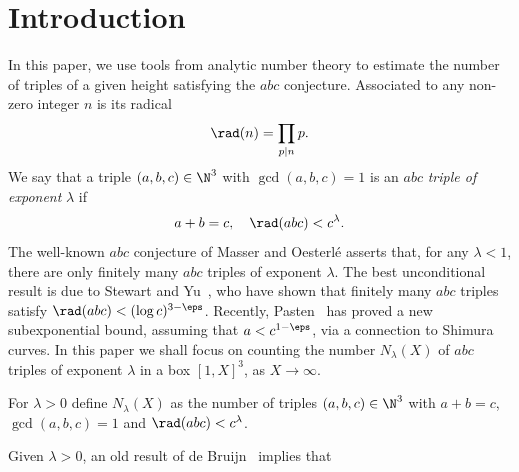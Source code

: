 
%

\chapter{Introduction}

In this paper, we use tools from analytic number theory to estimate the number of triples of a given height satisfying the $abc$ conjecture.
Associated to any non-zero integer $n$ is its radical
\begin{align*}
\rad(n)=\prod_{p\mid n}p.
\end{align*}
We say that a triple $(a,b,c)\in \N^3$
with $\gcd(a,b,c)=1$ is an $abc$ \emph{triple of exponent} $\lambda$ if
\begin{align*}
a+b=c,\quad \rad(abc) < c^{\lambda}.
\end{align*}
The well-known $abc$ conjecture of Masser and Oesterl\'e asserts that, for any $\lambda<1$, there are only finitely many $abc$ triples of exponent $\lambda$.
The best unconditional result is due to Stewart and Yu~\cite{styu}, who have shown that finitely many $abc$ triples satisfy $\rad(abc) < (\log c)^{3-\eps}$. Recently, Pasten~\cite{hector} has proved a new subexponential bound, assuming that $a<c^{1-\eps}$, via a connection to Shimura curves.
In this paper we shall focus on counting the number $N_\lambda(X)$ of $abc$ triples of exponent $\lambda$ in a box $[1,X]^3$, as $X\to \infty$.

\begin{definition}\label{def:Nlambda}
\leanok{}
For $\lambda>0$ define $N_\lambda(X)$ as the number of triples $(a,b,c)\in \N^3$ with $a+b=c$, $\gcd(a,b,c)=1$ and
$\rad(abc) < c^{\lambda}$.
\end{definition}

Given $\lambda>0$,
an old result of
de Bruijn~\cite{debruijn} implies that

